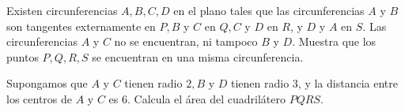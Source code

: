 Existen circunferencias $A,B,C,D$ en el plano tales que las circunferencias $A$ y $B$ son tangentes externamente en $P, B$ y $C$ en $Q, C$ y $D$ en $R$, y $D$ y $A$ en $S$. Las circunferencias $A$ y $C$ no se encuentran, ni tampoco $B$ y $D$.
Muestra que los puntos $P,Q,R,S$ se encuentran en una misma circunferencia.

Supongamos que $A$ y $C$ tienen radio $2, B$ y $D$ tienen radio $3$, y la distancia entre los centros de $A$ y $C$ es $6$. Calcula el área del cuadrilátero $PQRS$.
